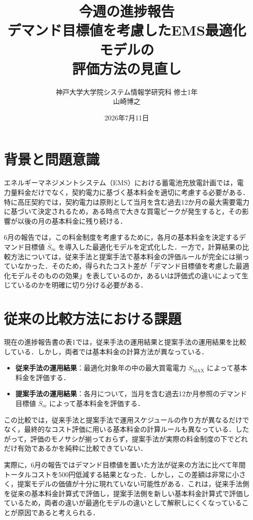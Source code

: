 \documentclass[a4paper,11pt,dvipdfmx]{jsarticle}
\title{今週の進捗報告\\[0.5em]\large デマンド目標値を考慮したEMS最適化モデルの\\評価方法の見直し}
\author{神戸大学大学院システム情報学研究科 修士1年\\山崎博之}
\date{2026年7月11日}
\begin{document}
\maketitle

\section{背景と問題意識}
エネルギーマネジメントシステム（EMS）における蓄電池充放電計画では，電力量料金だけでなく，契約電力に基づく基本料金を適切に考慮する必要がある．特に高圧契約では，契約電力は原則として当月を含む過去12か月の最大需要電力に基づいて決定されるため，ある時点で大きな買電ピークが発生すると，その影響が以後の月の基本料金に残り続ける．

6月の報告では，この料金制度を考慮するために，各月の基本料金を決定するデマンド目標値 $\bar{S}_{m}$ を導入した最適化モデルを定式化した．一方で，計算結果の比較方法については，従来手法と提案手法で基本料金の評価ルールが完全には揃っていなかった．そのため，得られたコスト差が「デマンド目標値を考慮した最適化モデルそのものの効果」を表しているのか，あるいは評価式の違いによって生じているのかを明確に切り分ける必要がある．

\section{従来の比較方法における課題}
現在の進捗報告書の表1では，従来手法の運用結果と提案手法の運用結果を比較している．しかし，両者では基本料金の計算方法が異なっている．

\begin{itemize}
    \item \textbf{従来手法の運用結果}：最適化対象年の中の最大買電電力 $S_{\mathrm{MAX}}$ によって基本料金を評価する．
    \item \textbf{提案手法の運用結果}：各月について，当月を含む過去12か月参照のデマンド目標値 $\bar{S}_{m}$ によって基本料金を評価する．
\end{itemize}

この比較では，従来手法と提案手法で運用スケジュールの作り方が異なるだけでなく，最終的なコスト評価に用いる基本料金の計算ルールも異なっている．したがって，評価のモノサシが揃っておらず，提案手法が実際の料金制度の下でどれだけ有効であるかを純粋に比較できていない．

実際に，6月の報告ではデマンド目標値を置いた方法が従来の方法に比べて年間トータルコストを500円低減する結果となった．しかし，この差額は非常に小さく，提案モデルの価値が十分に現れていない可能性がある．これは，従来手法側を従来の基本料金計算式で評価し，提案手法側を新しい基本料金計算式で評価しているため，両者の違いが最適化モデルの違いとして解釈しにくくなっていることが原因であると考えられる．
\end{document}
